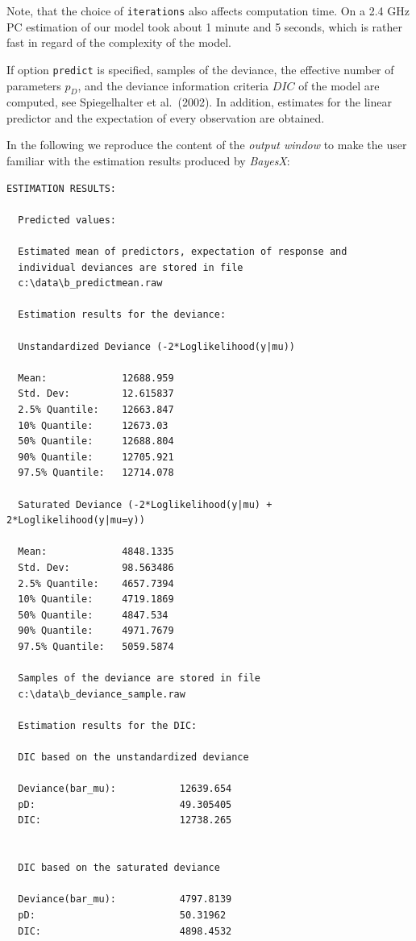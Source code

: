 Note, that the choice of {\tt iterations} also affects computation
time. On a 2.4 GHz PC estimation of our model took about 1 minute
and 5 seconds, which is rather fast in regard of the complexity of
the model.

If option {\tt predict} is specified, samples of the deviance, the
effective number of parameters $p_D$, and the deviance information
criteria $DIC$ of the model are computed, see Spiegelhalter et
al.~(2002). In addition, estimates for the linear predictor and
the expectation of every observation are obtained.

In the following we reproduce the content of the {\em output
window} to make the user familiar with the estimation results
produced by {\em BayesX}:

\footnotesize
\begin{verbatim}
ESTIMATION RESULTS:

  Predicted values:

  Estimated mean of predictors, expectation of response and
  individual deviances are stored in file
  c:\data\b_predictmean.raw

  Estimation results for the deviance:

  Unstandardized Deviance (-2*Loglikelihood(y|mu))

  Mean:             12688.959
  Std. Dev:         12.615837
  2.5% Quantile:    12663.847
  10% Quantile:     12673.03
  50% Quantile:     12688.804
  90% Quantile:     12705.921
  97.5% Quantile:   12714.078

  Saturated Deviance (-2*Loglikelihood(y|mu) + 2*Loglikelihood(y|mu=y))

  Mean:             4848.1335
  Std. Dev:         98.563486
  2.5% Quantile:    4657.7394
  10% Quantile:     4719.1869
  50% Quantile:     4847.534
  90% Quantile:     4971.7679
  97.5% Quantile:   5059.5874

  Samples of the deviance are stored in file
  c:\data\b_deviance_sample.raw

  Estimation results for the DIC:

  DIC based on the unstandardized deviance

  Deviance(bar_mu):           12639.654
  pD:                         49.305405
  DIC:                        12738.265


  DIC based on the saturated deviance

  Deviance(bar_mu):           4797.8139
  pD:                         50.31962
  DIC:                        4898.4532


\end{verbatim}
